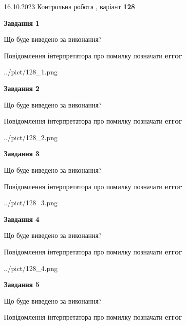 \documentclass[12pt, ukrainian]{article}
\begin{document}
{\Large{16.10.2023 Контрольна робота , варіант  \No \textbf { 128 }\par}}
{
\begin {large}
{\begin {center}\textbf{Завдання 1}\end {center}}\par
Що буде виведено за виконання? \par
Повідомлення інтерпретатора про помилку позначати \textbf{error}

\begin{center}
	{../pict/128_1.png}
\end{center}
\newpage

{\begin {center}\textbf{Завдання 2}\end {center}}\par
Що буде виведено за виконання? \par
Повідомлення інтерпретатора про помилку позначати \textbf{error}

\begin{center}
	{../pict/128_2.png}
\end{center}
\newpage

{\begin {center}\textbf{Завдання 3}\end {center}}\par
Що буде виведено за виконання? \par
Повідомлення інтерпретатора про помилку позначати \textbf{error}

\begin{center}
	{../pict/128_3.png}
\end{center}
\newpage

{\begin {center}\textbf{Завдання 4}\end {center}}\par
Що буде виведено за виконання? \par
Повідомлення інтерпретатора про помилку позначати \textbf{error}

\begin{center}
	{../pict/128_4.png}
\end{center}
\newpage

{\begin {center}\textbf{Завдання 5}\end {center}}\par
Що буде виведено за виконання? \par
Повідомлення інтерпретатора про помилку позначати \textbf{error}


\end{large}}
\end{document}
